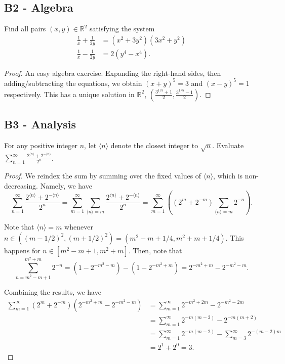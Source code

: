 \documentclass[11pt]{scrartcl}
\newcommand{\R}{\mathbb{R}}
\newcommand{\<}{\langle}
\renewcommand{\>}{\rangle}
\begin{document}
\pagebreak
\subsection{B2 - Algebra} 
Find all pairs $(x, y) \in \R^2$ satisfying the system
\begin{align*}
\frac{1}{x} + \frac{1}{2y} &= (x^2 + 3y^2)(3x^2 + y^2) \\
\frac{1}{x} - \frac{1}{2y} &= 2(y^4 - x^4).
\end{align*}

\begin{proof}
An easy algebra exercise.  Expanding the right-hand sides, then adding/subtracting the equations, we obtain $(x+y)^5 = 3$ and $(x - y)^5 = 1$ respectively.  This has a unique solution in $\R^2$, $\left(\frac{3^{1/5} + 1}{2}, \frac{3^{1/5} - 1}{2} \right)$.
\end{proof}
\pagebreak
\subsection{B3 - Analysis} 
For any positive integer $n$, let $\<n\>$ denote the closest integer to $\sqrt{n}$.  Evaluate $\sum_{n=1}^\infty \frac{2^{\<n\>} + 2^{-\<n\>}}{2^n}$.

\begin{proof}
We reindex the sum by summing over the fixed values of $\<n\>$, which is non-decreasing.  Namely, we have 
$$\sum_{n=1}^\infty \frac{2^{\<n\>} + 2^{-\<n\>}}{2^n} = \sum_{m=1}^\infty \sum_{\<n\> = m}  \frac{2^{\<n\>} + 2^{-\<n\>}}{2^n} = \sum_{m=1}^\infty \left((2^m + 2^{-m})\sum_{\<n\> = m} 2^{-n}\right).$$

Note that $\<n\> = m$ whenever $n \in ((m-1/2)^2, (m+1/2)^2) = (m^2 - m+ 1/4, m^2 + m + 1/4)$.  This happens for $n \in [m^2 - m + 1, m^2 + m ]$.  Then, note that $$\sum_{n=m^2 - m + 1}^{m^2 + m} 2^{-n} = (1 - 2^{-m^2 - m}) - (1 - 2^{-m^2 + m}) = 2^{-m^2 + m} - 2^{-m^2 - m}.$$

Combining the results, we have 
\begin{align*}
\sum_{m=1}^\infty (2^{m} + 2^{-m}) (2^{-m^2 + m} - 2^{-m^2 - m}) &= \sum_{m=1}^\infty 2^{-m^2 + 2m} - 2^{-m^2 - 2m} \\
&= \sum_{m=1}^\infty 2^{-m(m-2)} - 2^{-m(m+2)} \\
&= \sum_{m=1}^\infty 2^{-m(m-2)} -  \sum_{m=3}^\infty 2^{-(m-2)m}  \\
&= 2^{1} + 2^{0} = 3.
\end{align*}
\end{proof}
\pagebreak
\end{document}
